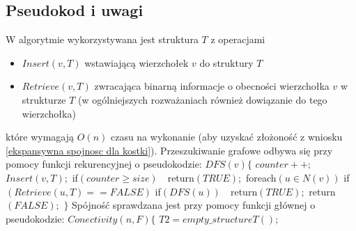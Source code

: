 \documentclass{pracamgr}
\begin{document}
   \subsection{Pseudokod i uwagi}
    W algorytmie wykorzystywana jest struktura $T$ z operacjami
    \begin{itemize}[noitemsep,topsep=4pt]
     \item $Insert(v,T)$ wstawiającą wierzchołek $v$ do struktury $T$
     \item $Retrieve(v,T)$ zwracająca binarną informacje o obecności wierzchołka $v$ w strukturze $T$
     (w ogólniejszych rozważaniach również dowiązanie do tego wierzchołka)
    \end{itemize}
    które wymagają $O(n)$ czasu na wykonanie (aby uzyskać złożoność z wniosku \ref{ekspansywna spojnosc dla kostki}).\newline
    Przeszukiwanie grafowe odbywa się przy pomocy funkcji rekurencyjnej o pseudokodzie:\newline\newline
    \hspace*{100pt}$DFS(v)\{$\newline
    \hspace*{116pt}	$counter++;$\newline
    \hspace*{116pt}	$Insert(v,T);$\newline
    \hspace*{116pt}	if$(counter\ge size)\quad $return$(TRUE);$\newline
    \hspace*{116pt}	foreach$(u\in N(v))$\newline
    \hspace*{132pt}		if$(Retrieve(u,T)==FALSE)$\newline
    \hspace*{148pt}			if$(DFS(u))\quad $return$(TRUE);$\newline
    \hspace*{116pt}	return$(FALSE);$\newline
    \hspace*{100pt}$\}$\newline
    Spójność sprawdzana jest przy pomocy funkcji głównej o pseudokodzie:\newline\newline
    \hspace*{100pt}$Conectivity(n,F)\{$\newline
    \hspace*{116pt}	$T2=empty\_structureT();$\newline
\end{document}
